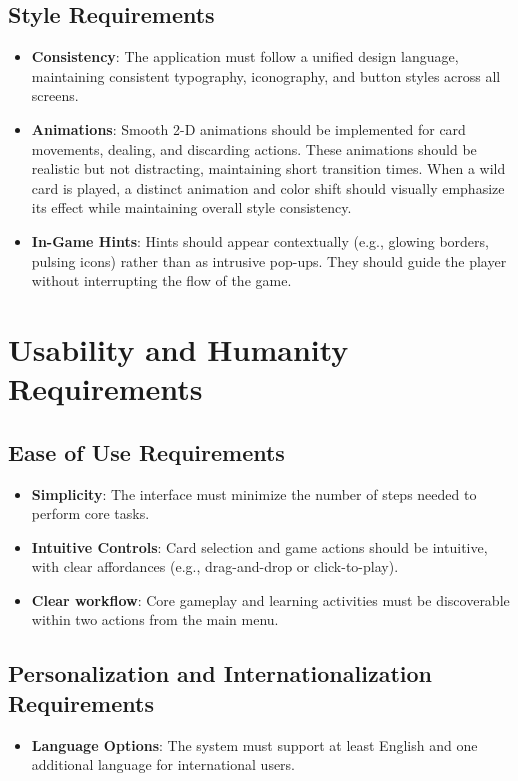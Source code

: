 \documentclass[12pt]{article}
\begin{document}
\subsection{Style Requirements}
	\begin{itemize}
		\item \textbf{Consistency}: The application must follow a unified design language, maintaining consistent typography, iconography, and button styles across all screens.
		\item \textbf{Animations}: Smooth 2-D animations should be implemented for card movements, dealing, and discarding actions. These animations should be realistic but not distracting, maintaining short transition times. When a wild card is played, a distinct animation and color shift should visually emphasize its effect while maintaining overall style consistency.
		\item \textbf{In-Game Hints}: Hints should appear contextually (e.g., glowing borders, pulsing icons) rather than as intrusive pop-ups. They should guide the player without interrupting the flow of the game.
		
	\end{itemize}

\section{Usability and Humanity Requirements}
\subsection{Ease of Use Requirements}
	\begin{itemize}
		\item \textbf{Simplicity}: The interface must minimize the number of steps needed to perform core tasks.
		\item \textbf{Intuitive Controls}: Card selection and game actions should be intuitive, with clear affordances (e.g., drag-and-drop or click-to-play).
		\item \textbf{Clear workflow}: Core gameplay and learning activities must be discoverable within two actions from the main menu.
	\end{itemize}
\subsection{Personalization and Internationalization Requirements}
	\begin{itemize}
		\item \textbf{Language Options}: The system must support at least English and one additional language for international users.
	\end{itemize}
\end{document}
